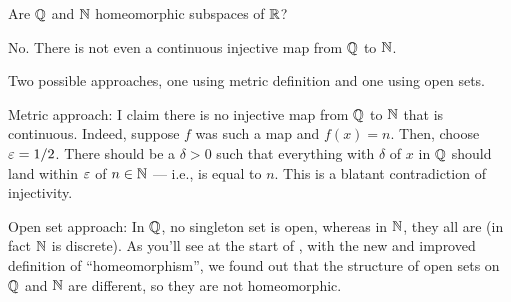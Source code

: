 \begin{problem}
	Are $\mathbb Q$ and $\mathbb N$ homeomorphic subspaces of $\mathbb R$?
	\begin{hint}
		No. There is not even a continuous injective map from $\mathbb Q$ to $\mathbb N$.
	\end{hint}
	\begin{sol}
		Two possible approaches, one using metric definition
		and one using open sets.

		Metric approach: I claim there is no injective map from $\mathbb Q$ to $\mathbb N$
		that is continuous. Indeed, suppose $f$ was such a map and $f(x) = n$.
		Then, choose $\varepsilon = 1/2$.
		There should be a $\delta > 0$ such that everything with $\delta$ of $x$
		in $\mathbb Q$ should land within $\varepsilon$ of $n \in \mathbb N$ --- i.e., is equal to $n$.
		This is a blatant contradiction of injectivity.

		Open set approach: In $\mathbb Q$, no singleton set is open,
		whereas in $\mathbb N$, they all are (in fact $\mathbb N$ is discrete).
		As you'll see at the start of ,
		with the new and improved definition of ``homeomorphism'',
		we found out that the structure of open sets on $\mathbb Q$ and $\mathbb N$ are different,
		so they are not homeomorphic.
	\end{sol}
\end{problem}

